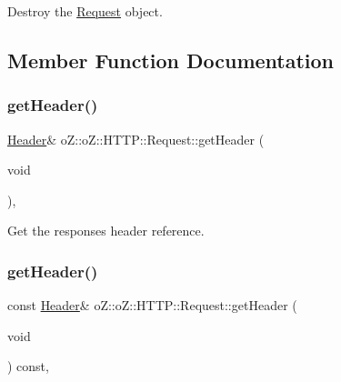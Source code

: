 Destroy the \mbox{\hyperlink{classo_z_1_1o_z_1_1_h_t_t_p_1_1_request}{Request}} object. 



\subsection{Member Function Documentation}
\mbox{\label{classo_z_1_1o_z_1_1_h_t_t_p_1_1_request_acdf258d4e597e670186b8758932d8a1f}} 
\subsubsection{\texorpdfstring{getHeader()}{getHeader()}\hspace{0.1cm}{\footnotesize\ttfamily [1/2]}}
{\footnotesize\ttfamily \mbox{\hyperlink{classo_z_1_1o_z_1_1_h_t_t_p_1_1_header}{Header}}\& o\+Z\+::o\+Z\+::\+H\+T\+T\+P\+::\+Request\+::get\+Header (\begin{DoxyParamCaption}\item[{void}]{ }\end{DoxyParamCaption})\hspace{0.3cm}{\ttfamily [inline]}, {\ttfamily [noexcept]}}



Get the response\textquotesingle{}s header reference. 

\mbox{\label{classo_z_1_1o_z_1_1_h_t_t_p_1_1_request_a6d9b74125b18ffd91062fa69fdadb3c9}} 
\subsubsection{\texorpdfstring{getHeader()}{getHeader()}\hspace{0.1cm}{\footnotesize\ttfamily [2/2]}}
{\footnotesize\ttfamily const \mbox{\hyperlink{classo_z_1_1o_z_1_1_h_t_t_p_1_1_header}{Header}}\& o\+Z\+::o\+Z\+::\+H\+T\+T\+P\+::\+Request\+::get\+Header (\begin{DoxyParamCaption}\item[{void}]{ }\end{DoxyParamCaption}) const\hspace{0.3cm}{\ttfamily [inline]}, {\ttfamily [noexcept]}}




